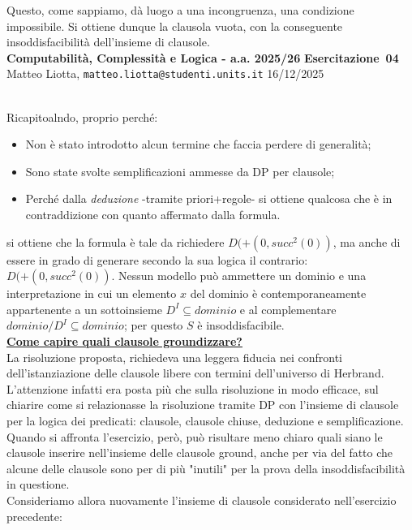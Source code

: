 \documentclass[a4paper,10pt]{article}
\makeatletter
\newcommand{\DocType}{Esercitazione} %
\newcommand{\FullTitle}{\DocType\ \EsercitazioneNum}
\newcommand{\Header}{
\noindent
  \small \textbf{Computabilità, Complessità e Logica - a.a. 2025/26} \hfill \textbf{\FullTitle} \\[0.2cm]
  \scriptsize Matteo Liotta, \texttt{matteo.liotta@studenti.units.it} \hfill \Data \\[0.2cm]
  \noindent\makebox[\linewidth]{\rule{\linewidth}{0.4pt}} \\[0.3cm]}
\newcommand{\NewPageHeader}{
  \vfill
  \noindent\makebox[\linewidth]{\rule{\linewidth}{0.4pt}}
  \newpage
  {\Header}
}
\newcommand{\EsercitazioneNum}{04}
\newcommand{\Data}{16/12/2025}
\makeatother
\begin{document}
Questo, come sappiamo, dà luogo a una incongruenza, una condizione impossibile. Si ottiene dunque la clausola vuota, con la conseguente insoddisfacibilità dell'insieme di clausole.\\

\NewPageHeader

Ricapitoalndo, proprio perché:
\begin{itemize}
    \item Non è stato introdotto alcun termine che faccia perdere di generalità;
    \item Sono state svolte semplificazioni ammesse da DP per clausole;
    \item Perché dalla \textit{deduzione} -tramite priori+regole- si ottiene qualcosa che è in contraddizione con quanto affermato dalla formula.
\end{itemize}
si ottiene che la formula è tale da richiedere $D(+(0, succ^2(0))$, ma anche di essere in grado di generare secondo la sua logica il contrario: $D(+(0, succ^2(0))$. Nessun modello può ammettere un dominio e una interpretazione in cui un elemento $x$ del dominio è contemporaneamente appartenente a un sottoinsieme $D^I\subseteq dominio$ e al complementare $dominio/D^I\subseteq dominio$; per questo $S$ è insoddisfacibile.\\[0.1cm]


\underline{\textbf{Come capire quali clausole groundizzare?}}\\

La risoluzione proposta, richiedeva una leggera fiducia nei confronti dell'istanziazione delle clausole libere con termini dell'universo di Herbrand. L'attenzione infatti era posta più che sulla risoluzione in modo efficace, sul chiarire come si relazionasse la risoluzione tramite DP con l'insieme di clausole per la logica dei predicati: clausole, clausole chiuse, deduzione e semplificazione.
Quando si affronta l'esercizio, però, può risultare meno chiaro quali siano le clausole inserire nell'insieme delle clausole ground, anche per via del fatto che alcune delle clausole sono per di più "inutili" per la prova della insoddisfacibilità in questione.\\

Consideriamo allora nuovamente l'insieme di clausole considerato nell'esercizio precedente:
\end{document}
